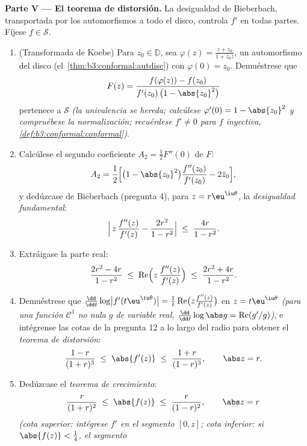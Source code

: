 \begin{problem}
\medskip
\noindent\textbf{Parte V --- El teorema de distorsión.} La desigualdad
de Bieberbach, transportada por los automorfismos a todo el disco,
controla $f'$ en todas partes. Fíjese $f \in \mathcal
S$.
\begin{enumerate}[resume]
  \item (Transformada de Koebe) Para $z_0 \in \mathbb D$, sea
  $\varphi(z) = \frac{z + z_0}{1 + \bar z_0z}$, un automorfismo del
  disco (el~\cref{thm:b3:conformal:autdisc}) con $\varphi(0) = z_0$.
  Demuéstrese que
        \[
        F(z) = \frac{f(\varphi(z)) - f(z_0)}
        {f'(z_0)\,\bigl(1 - \abs{z_0}^2\bigr)}
        \]
        pertenece a $\mathcal S$ \emph{(la univalencia se hereda;
        calcúlese $\varphi'(0) = 1 - \abs{z_0}^2$ y compruébese la
        normalización; recuérdese $f' \neq 0$ para $f$ inyectiva,
        \cref{def:b3:conformal:conformal})}.
  \item Calcúlese el segundo coeficiente $A_2 = \frac12F''(0)$ de $F$:
        \[
        A_2 = \frac12\Bigl[\bigl(1 - \abs{z_0}^2\bigr)
        \frac{f''(z_0)}{f'(z_0)} - 2\bar z_0\Bigr] ,
        \]
        y dedúzcase de Bieberbach (pregunta 4), para $z =
        r\eu^{\iu\theta}$, la \emph{desigualdad fundamental}:
        \[
        \Bigl|\,z\,\frac{f''(z)}{f'(z)} -
        \frac{2r^2}{1 - r^2}\Bigr|
        \;\leq\; \frac{4r}{1 - r^2} .
        \]
  \item Extráigase la parte real:
        \[
        \frac{2r^2 - 4r}{1 - r^2} \;\leq\;
        \operatorname{Re}\Bigl(z\,\frac{f''(z)}{f'(z)}\Bigr)
        \;\leq\; \frac{2r^2 + 4r}{1 - r^2} .
        \]
  \item Demuéstrese que $\frac{\dd}{\dd t}\log\bigl|
        f'(t\eu^{\iu\theta})\bigr| = \frac1t
        \operatorname{Re}\bigl(z\frac{f''(z)}{f'(z)}\bigr)$ en
  $z = t\eu^{\iu\theta}$ \emph{(para una función $\mathcal C^1$ no nula
  $g$ de variable real, $\frac{\dd}{\dd t}\log\abs g =
        \operatorname{Re}(g'/g)$)}, e intégrense las cotas de la
  pregunta 12 a lo largo del radio para obtener el \emph{teorema de
  distorsión}:
        \[
        \frac{1 - r}{(1 + r)^3} \;\leq\; \abs{f'(z)}
        \;\leq\; \frac{1 + r}{(1 - r)^3},
        \qquad \abs z = r .
        \]
  \item Dedúzcase el \emph{teorema de crecimiento}:
        \[
        \frac{r}{(1 + r)^2} \;\leq\; \abs{f(z)} \;\leq\;
        \frac{r}{(1 - r)^2},
        \qquad \abs z = r
        \]
        \emph{(cota superior: intégrese $f'$ en el segmento $[0, z]$;
        cota inferior: si $\abs{f(z)} < \frac14$, el segmento
}
\end{enumerate}
\end{problem}
